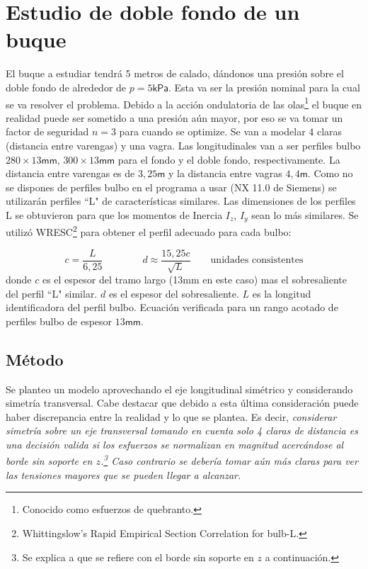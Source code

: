 \documentclass[onecolumn,10pt,titlepage]{article}
\newcommand{\unit}[1]{\textsf{#1}}
\newcommand{\milli}{\unit{m}}
\newcommand{\meter}{\unit{m}}
\newcommand{\pascal}{\unit{Pa}}
\newcommand{\kilo}{\unit{k}}
\newcommand{\si}[1]{#1}
\newcommand{\SI}[2]{#1\si{#2}}
\begin{document}
\section{Estudio de doble fondo de un buque}
El buque a estudiar tendrá 5 metros de calado, dándonos una presión sobre el doble fondo de alrededor de $p=5 \si{\kilo \pascal}$. Esta va ser la presión nominal para la cual se va resolver el problema. Debido a la acción ondulatoria de las olas\footnote{Conocido como esfuerzos de quebranto.} el buque en realidad puede ser sometido a una presión aún mayor, por eso se va tomar un factor de seguridad $n=3$ para cuando se optimize. Se van a modelar 4 claras (distancia entre varengas) y una vagra. Las longitudinales van a ser perfiles bulbo $280\times13\si{\milli \meter}$, $300\times 13 \si{\milli \meter}$ para el fondo y el doble fondo, respectivamente. La distancia entre varengas es de $3,25\si{\meter}$ y la distancia entre vagras $4,4\si{\meter}$. Como no se dispones de perfiles bulbo en el programa a usar (NX 11.0 de Siemens) se utilizarán perfiles ``L"{} de características similares. Las dimensiones de los perfiles L se obtuvieron para que los momentos de Inercia $I_z$, $I_y$ sean lo más similares. Se utilizó WRESC\footnote{Whittingslow's Rapid Empirical Section Correlation for bulb-L.} para obtener el perfil adecuado para cada bulbo:

\begin{equation} \label{eq:WREC}
c = \frac{L}{6,25}  \qquad\qquad d \approx \frac{15,25c}{\sqrt{L}} \qquad \textrm{unidades consistentes}
\end{equation}
donde $c$ es el espesor del tramo largo (\SI{13}{\milli \meter} en este caso) mas el sobresaliente del perfil ``L"{} similar. $d$ es el espesor del sobresaliente. $L$ es la longitud identificadora del perfil bulbo. Ecuación verificada para un rango acotado de perfiles bulbo de espesor $13\si{\milli\meter}$.


\subsection{Método}
Se planteo un modelo aprovechando el eje longitudinal simétrico y considerando simetría transversal. Cabe destacar que debido a esta última consideración puede haber discrepancia entre la realidad y lo que se plantea. Es decir, \emph{considerar simetría sobre un eje transversal tomando en cuenta solo 4 claras de distancia es una decisión valida si los esfuerzos se normalizan en magnitud acercándose al borde sin soporte en $z$.\footnote{Se explica a que se refiere con el borde sin soporte en $z$ a continuación.} Caso contrario se debería tomar aún más claras para ver las tensiones mayores que se pueden llegar a alcanzar.}
\end{document}
